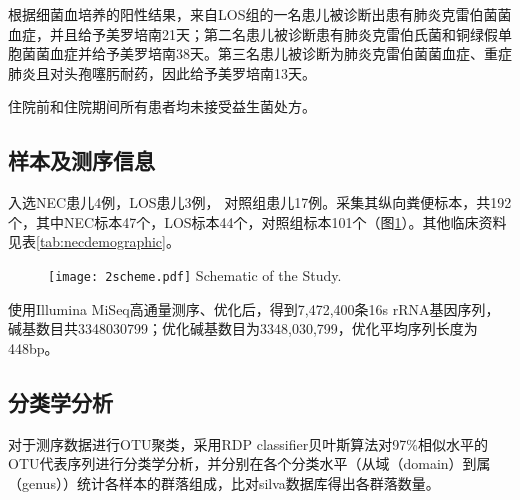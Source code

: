     根据细菌血培养的阳性结果，来自LOS组的一名患儿被诊断出患有肺炎克雷伯菌菌血症，并且给予美罗培南21天；第二名患儿被诊断患有肺炎克雷伯氏菌和铜绿假单胞菌菌血症并给予美罗培南38天。第三名患儿被诊断为肺炎克雷伯菌菌血症、重症肺炎且对头孢噻肟耐药，因此给予美罗培南13天。

    住院前和住院期间所有患者均未接受益生菌处方。

  \subsection{样本及测序信息}
  入选NEC患儿4例，LOS患儿3例， 对照组患儿17例。采集其纵向粪便标本，共192个，其中NEC标本47个，LOS标本44个，对照组标本101个（图\ref{fig:2scheme}）。其他临床资料见表\ref{tab:necdemographic}。
  \begin{figure}[!htp]
    \centering
    \texttt{[image: 2scheme.pdf]}
      {Schematic of the Study.}
    \label{fig:2scheme}
  \end{figure}


  使用Illumina MiSeq高通量测序、优化后，得到7,472,400条16s rRNA基因序列，碱基数目共3348030799；优化碱基数目为3348,030,799，优化平均序列长度为448bp。
  \subsection{分类学分析}
  对于测序数据进行OTU聚类，采用RDP classifier贝叶斯算法对97\%相似水平的OTU代表序列进行分类学分析，并分别在各个分类水平（从域（domain）到属（genus））统计各样本的群落组成，比对silva数据库得出各群落数量。
